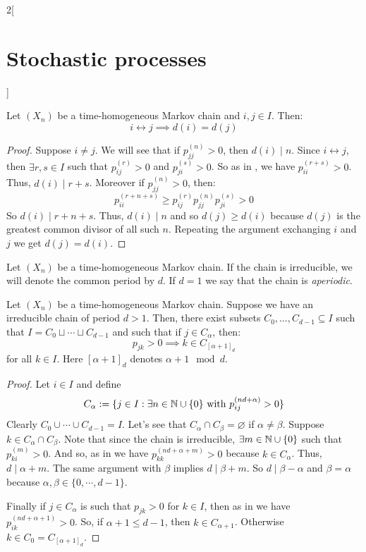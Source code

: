 \documentclass[../../../main_math.tex]{subfiles}
\begin{document}
\begin{multicols}{2}[\section{Stochastic processes}]
  \begin{proposition}
    Let $(X_n)$ be a time-homogeneous Markov chain and $i,j\in I$. Then: $$i\leftrightarrow j\implies d(i)=d(j)$$
  \end{proposition}
  \begin{proof}
    Suppose $i\ne j$. We will see that if $p_{jj}^{(n)}>0$, then $d(i)\mid n$. Since $i\leftrightarrow j$, then $\exists r,s\in I$ such that $p_{ij}^{(r)}>0$ and $p_{ji}^{(s)}>0$. So as in , we have $p_{ii}^{(r+s)}>0$. Thus, $d(i)\mid r+s$. Moreover if $p_{jj}^{(n)}>0$, then:
    $$p_{ii}^{(r+n+s)}\geq p_{ij}^{(r)}p_{jj}^{(n)}p_{ji}^{(s)}>0$$
    So $d(i)\mid r+n+s$. Thus, $d(i)\mid n$ and so $d(j)\geq d(i)$ because $d(j)$ is the greatest common divisor of all such $n$. Repeating the argument exchanging $i$ and $j$ we get $d(j)= d(i)$.
  \end{proof}
  \begin{definition}
    Let $(X_n)$ be a time-homogeneous Markov chain. If the chain is irreducible, we will denote the common period by $d$. If $d=1$ we say that the chain is \emph{aperiodic}.
  \end{definition}
  \begin{proposition}
    Let $(X_n)$ be a time-homogeneous Markov chain. Suppose we have an irreducible chain of period $d>1$. Then, there exist subsets $C_0,\ldots,C_{d-1}\subseteq I$ such that $I=C_0\sqcup\cdots\sqcup C_{d-1}$ and such that if $j\in C_\alpha$, then:
    $$p_{jk}>0\implies k\in C_{{[\alpha+1]}_d}$$
    for all $k\in I$. Here ${[\alpha+1]}_d$ denotes $\alpha+1\mod{d}$.
  \end{proposition}
  \begin{proof}
    Let $i\in I$ and define
    $$C_\alpha:=\{j\in I:\exists n\in\mathbb{N}\cup\{0\}\text{ with }p_{ij}^{(n d+\alpha)}>0\}$$
    Clearly $C_0\cup\cdots\cup C_{d-1}=I$. Let's see that $C_\alpha\cap C_\beta=\varnothing$ if $\alpha\ne\beta$. Suppose $k\in C_\alpha\cap C_\beta$. Note that since the chain is irreducible, $\exists m\in\mathbb{N}\cup\{0\}$ such that $p_{ki}^{(m)}>0$. And so, as in  we have $p_{kk}^{(n d+\alpha+m)}>0$ because $k\in C_\alpha$. Thus, $d\mid \alpha+m$. The same argument with $\beta$ implies $d\mid \beta+m$. So $d\mid \beta -\alpha$ and $\beta=\alpha$ because $\alpha,\beta\in\{0,\cdots,d-1\}$.

    Finally if $j\in C_\alpha$ is such that $p_{jk}>0$ for $k\in I$, then as in  we have $p_{ik}^{(n d+\alpha +1)}>0$. So, if $\alpha+1\leq d-1$, then $k\in C_{\alpha+1}$. Otherwise $k\in C_0=C_{[\alpha+1]_d}$.
  \end{proof}

\end{multicols}
\end{document}
